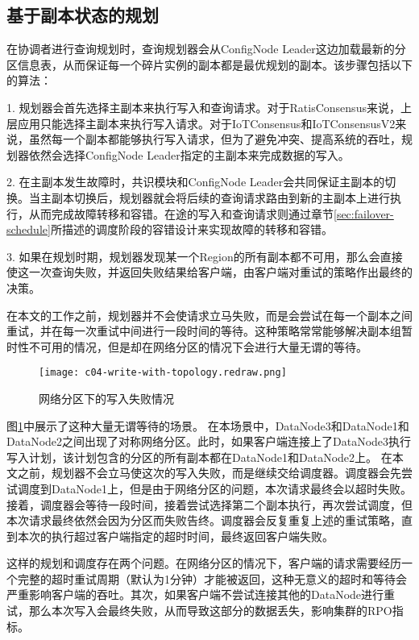 \subsection{基于副本状态的规划}

在协调者进行查询规划时，查询规划器会从ConfigNode Leader这边加载最新的分区信息表，从而保证每一个碎片实例的副本都是最优规划的副本。该步骤包括以下的算法：

1. 规划器会首先选择主副本来执行写入和查询请求。对于RatisConsensus来说，上层应用只能选择主副本来执行写入请求。对于IoTConsensus和IoTConsensusV2来说，虽然每一个副本都能够执行写入请求，但为了避免冲突、提高系统的吞吐，规划器依然会选择ConfigNode Leader指定的主副本来完成数据的写入。

2. 在主副本发生故障时，共识模块和ConfigNode Leader会共同保证主副本的切换。当主副本切换后，规划器就会将后续的查询请求路由到新的主副本上进行执行，从而完成故障转移和容错。在途的写入和查询请求则通过章节\ref{sec:failover-schedule}所描述的调度阶段的容错设计来实现故障的转移和容错。

3. 如果在规划时期，规划器发现某一个Region的所有副本都不可用，那么会直接使这一次查询失败，并返回失败结果给客户端，由客户端对重试的策略作出最终的决策。

在本文的工作之前，规划器并不会使请求立马失败，而是会尝试在每一个副本之间重试，并在每一次重试中间进行一段时间的等待。这种策略常常能够解决副本组暂时性不可用的情况，但是却在网络分区的情况下会进行大量无谓的等待。

\begin{figure}
  \centering
  \texttt{[image: c04-write-with-topology.redraw.png]}
  \caption{网络分区下的写入失败情况}
  \label{fig:c04-write-with-topology}
\end{figure}

图\ref{fig:c04-write-with-topology}中展示了这种大量无谓等待的场景。
在本场景中，DataNode3和DataNode1和DataNode2之间出现了对称网络分区。此时，如果客户端连接上了DataNode3执行写入计划，该计划包含的分区的所有副本都在DataNode1和DataNode2上。
在本文之前，规划器不会立马使这次的写入失败，而是继续交给调度器。调度器会先尝试调度到DataNode1上，但是由于网络分区的问题，本次请求最终会以超时失败。接着，调度器会等待一段时间，接着尝试选择第二个副本执行，再次尝试调度，但本次请求最终依然会因为分区而失败告终。调度器会反复重复上述的重试策略，直到本次的执行超过客户端指定的超时时间，最终返回客户端失败。

这样的规划和调度存在两个问题。在网络分区的情况下，客户端的请求需要经历一个完整的超时重试周期（默认为1分钟）才能被返回，这种无意义的超时和等待会严重影响客户端的吞吐。其次，如果客户端不尝试连接其他的DataNode进行重试，那么本次写入会最终失败，从而导致这部分的数据丢失，影响集群的RPO指标。

